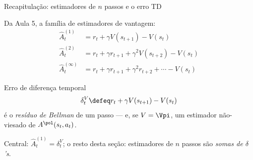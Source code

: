 \documentclass[aspectratio=169, 10pt]{beamer}
\newcommand{\Ahat}{\hat{A}}
\newcommand{\Advpi}{A^{\pol}}
\begin{document}
\begin{frame}{Recapitulação: estimadores de $n$ passos e o erro TD}

  Da Aula 5, a família de estimadores de vantagem:
  \begin{align*}
    \Ahat^{(1)}_t &= r_t + \gamma V(s_{t+1}) - V(s_t)\\
    \Ahat^{(2)}_t &= r_t + \gamma r_{t+1} + \gamma^2 V(s_{t+2}) - V(s_t)\\
    \Ahat^{(\infty)}_t &= r_t + \gamma r_{t+1} + \gamma^2 r_{t+2} + \cdots - V(s_t)
  \end{align*}

  \begin{defbox}{Erro de diferença temporal}
    \[
      \delta^V_t \defeq r_t + \gamma V(s_{t+1}) - V(s_t)
    \]
    é o \emph{resíduo de Bellman} de um passo --- e, se $V = \Vpi$, um estimador
    não-viesado de $\Advpi(s_t,a_t)$.
  \end{defbox}

  \begin{ideiabox}
    Central: $\Ahat^{(1)}_t = \delta^V_t$; o resto desta seção: estimadores de
    $n$ passos são \emph{somas de $\delta$'s}.
  \end{ideiabox}
\end{frame}
\end{document}
